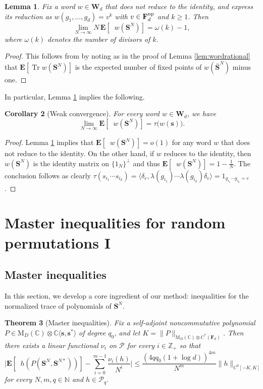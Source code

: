 \documentclass[10pt,reqno]{amsart}
\newtheorem{thm}{Theorem}[section]
\newtheorem{lem}[thm]{Lemma}
\newtheorem{cor}[thm]{Corollary}
\theoremstyle{definition}
\theoremstyle{remark}
\numberwithin{equation}{section}
\numberwithin{figure}{section}
\numberwithin{table}{section}
\newcommand{\tr}{\mathop{\mathrm{Tr}}}
\newcommand{\ntrN}{\mathop{\mathrm{tr}_N}}
\newcommand{\ntrND}{\mathop{\mathrm{tr}_{DN}}}
\newcommand{\EE}{\mathbf{E}}
\begin{document}
\begin{lem}
\label{lem:nica}
Fix a word $w\in\mathbf{W}_d$ that does not reduce to the identity, and express 
its reduction as $w(g_1,\ldots,g_d)=v^k$ with
$v\in\mathbf{F}_d^{\rm np}$ and $k\ge 1$. Then
$$
        \lim_{N\to\infty}
        N\,\mathbf{E}[\ntrN w(\boldsymbol{S}^N)] = \omega(k)-1,
$$
where $\omega(k)$ denotes the number of divisors of $k$.
\end{lem}

\begin{proof}
This follows from \cite[Corollary 1.3]{Nic94} by noting
as in the proof of Lemma \ref{lem:wordrational} that
$\mathbf{E}[\tr w(\boldsymbol{S}^N)]$ is the expected number of fixed points
of $w(\boldsymbol{\bar S}^N)$ minus one.
\end{proof}

In particular, Lemma \ref{lem:nica} implies the following.

\begin{cor}[Weak convergence]
\label{cor:waf}
For every word $w\in\mathbf{W}_d$, we have
$$
	\lim_{N\to\infty} 
	\mathbf{E}[\ntrN w(\boldsymbol{S}^N)] =
	\tau\big(w(\boldsymbol{s})\big).
$$
\end{cor}

\begin{proof}
Lemma \ref{lem:nica} implies that $\EE[\ntrN w(\boldsymbol{S}^N)]=o(1)$ 
for any word $w$ that does not reduce to the identity. On the other hand, 
if $w$ reduces to the identity, then $w(\boldsymbol{S}^N)$ is the identity 
matrix on $\{1_N\}^\perp$ and thus $\EE[\ntrN 
w(\boldsymbol{S}^N)]=1-\frac{1}{N}$. The conclusion follows as clearly 
$\tau(s_{i_1}\cdots s_{i_k})=
\langle \delta_e,\lambda(g_{i_1})\cdots\lambda(g_{i_k}) 
\delta_e\rangle=1_{g_{i_1}\cdots g_{i_k}=e}$.
\end{proof}


\section{Master inequalities for random permutations I}
\label{sec:masterI}

\subsection{Master inequalities}

In this section, we develop a core ingredient of our method: 
inequalities for the normalized trace of polynomials of 
$\boldsymbol{S}^N$.

\begin{thm}[Master inequalities]
\label{thm:masterperm}
Fix a self-adjoint noncommutative polynomial $P\in
\mathrm{M}_D(\mathbb{C})\otimes\mathbb{C}\langle
\boldsymbol{s},\boldsymbol{s}^*\rangle$ of degree $q_0$, and let 
$K=\|P\|_{\mathrm{M}_D(\mathbb{C})\otimes C^*(\mathbf{F}_d)}$. Then there 
exists a linear functional $\nu_i$ on $\mathcal{P}$ for every 
$i\in\mathbb{Z}_+$ so that
$$
	\bigg|\EE[
	\ntrND h(P(\boldsymbol{S}^N,\boldsymbol{S}^{N*}))]
	- \sum_{i=0}^{m-1} \frac{\nu_i(h)}{N^i}
	\bigg|
	\le
	\frac{(4qq_0(1+\log d))^{4m}}{N^m} \|h\|_{C^0[-K,K]}
$$
for every $N,m,q\in\mathbb{N}$ and $h\in\mathcal{P}_q$.
\end{thm}
\end{document}
